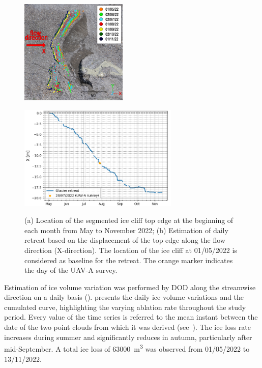\begin{figure}
  \centering
  \begin{minipage}[b]{0.45\textwidth}
    \centering
    \includegraphics[height=50mm]{4_top_border_series_map.png}\\
  \end{minipage}
  \hspace{0.05\textwidth}
  \begin{minipage}[b]{0.45\textwidth}
    \centering
    \includegraphics[height=50mm]{4_glacier_retreat.png}\\
  \end{minipage}
  \caption{(a) Location of the segmented ice cliff top edge at the beginning of each
    month from May to November 2022;
    (b) Estimation of daily retreat based on the displacement of the top edge along the
    flow direction (X-direction).
    The location of the ice cliff at 01/05/2022 is considered as baseline for the
    retreat.
    The orange marker indicates the day of the UAV-A survey.}
  \label{fig:4:retreat}
\end{figure}

Estimation of ice volume variation was performed by DOD along the
streamwise direction on a daily basis ().
 presents the daily ice volume variations and the cumulated
curve, highlighting the varying ablation rate throughout the study period.
Every value of the time series is referred to the mean instant between the date of the
two point clouds from which it was derived (see~).
The ice loss rate increases during summer and significantly reduces in autumn,
particularly after mid-September.
A total ice loss of \SI{63000}{\cubic\meter} was observed from 01/05/2022 to 13/11/2022.

